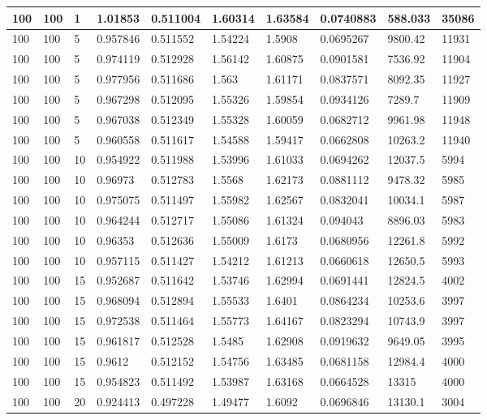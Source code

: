 \begin{landscape}
\begin{longtable}{ | l | l | l | l | l | l | l | l | l | l | }
100 & 100 & 1 & 1.01853 & 0.511004 & 1.60314 & 1.63584 & 0.0740883 & 588.033 & 35086\\ \hline
100 & 100 & 5 & 0.957846 & 0.511552 & 1.54224 & 1.5908 & 0.0695267 & 9800.42 & 11931\\ \hline
100 & 100 & 5 & 0.974119 & 0.512928 & 1.56142 & 1.60875 & 0.0901581 & 7536.92 & 11904\\ \hline
100 & 100 & 5 & 0.977956 & 0.511686 & 1.563 & 1.61171 & 0.0837571 & 8092.35 & 11927\\ \hline
100 & 100 & 5 & 0.967298 & 0.512095 & 1.55326 & 1.59854 & 0.0934126 & 7289.7 & 11909\\ \hline
100 & 100 & 5 & 0.967038 & 0.512349 & 1.55328 & 1.60059 & 0.0682712 & 9961.98 & 11948\\ \hline
100 & 100 & 5 & 0.960558 & 0.511617 & 1.54588 & 1.59417 & 0.0662808 & 10263.2 & 11940\\ \hline
100 & 100 & 10 & 0.954922 & 0.511988 & 1.53996 & 1.61033 & 0.0694262 & 12037.5 & 5994\\ \hline
100 & 100 & 10 & 0.96973 & 0.512783 & 1.5568 & 1.62173 & 0.0881112 & 9478.32 & 5985\\ \hline
100 & 100 & 10 & 0.975075 & 0.511497 & 1.55982 & 1.62567 & 0.0832041 & 10034.1 & 5987\\ \hline
100 & 100 & 10 & 0.964244 & 0.512717 & 1.55086 & 1.61324 & 0.094043 & 8896.03 & 5983\\ \hline
100 & 100 & 10 & 0.96353 & 0.512636 & 1.55009 & 1.6173 & 0.0680956 & 12261.8 & 5992\\ \hline
100 & 100 & 10 & 0.957115 & 0.511427 & 1.54212 & 1.61213 & 0.0660618 & 12650.5 & 5993\\ \hline
100 & 100 & 15 & 0.952687 & 0.511642 & 1.53746 & 1.62994 & 0.0691441 & 12824.5 & 4002\\ \hline
100 & 100 & 15 & 0.968094 & 0.512894 & 1.55533 & 1.6401 & 0.0864234 & 10253.6 & 3997\\ \hline
100 & 100 & 15 & 0.972538 & 0.511464 & 1.55773 & 1.64167 & 0.0823294 & 10743.9 & 3997\\ \hline
100 & 100 & 15 & 0.961817 & 0.512528 & 1.5485 & 1.62908 & 0.0919632 & 9649.05 & 3995\\ \hline
100 & 100 & 15 & 0.9612 & 0.512152 & 1.54756 & 1.63485 & 0.0681158 & 12984.4 & 4000\\ \hline
100 & 100 & 15 & 0.954823 & 0.511492 & 1.53987 & 1.63168 & 0.0664528 & 13315 & 4000\\ \hline
100 & 100 & 20 & 0.924413 & 0.497228 & 1.49477 & 1.6092 & 0.0696846 & 13130.1 & 3004\\ \hline

\end{longtable}
\end{landscape}
